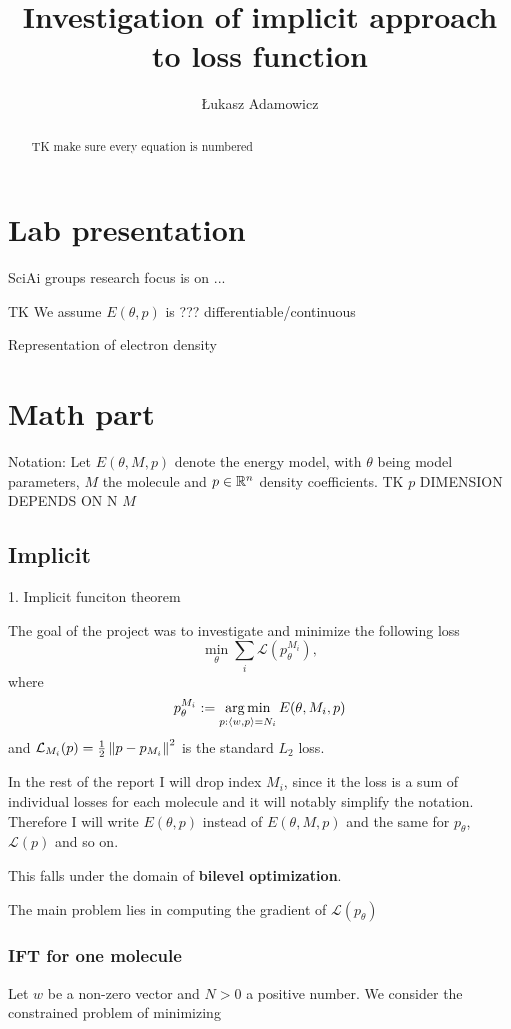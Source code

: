 \documentclass[a4paper,10pt]{report}
\title{Investigation of implicit approach to loss function}
\author{Łukasz Adamowicz}
\begin{document}
\maketitle

\begin{abstract}
TK make sure every equation is numbered
\end{abstract}



\section{ Lab presentation}
SciAi groups research focus is on ...

TK
We assume $E(\theta, p)$ is ??? differentiable/continuous

Representation of electron density
 \section{Math part}
Notation: Let $E(\theta, M ,p)$ denote the energy model, with $\theta$ being model parameters, $M$ the molecule and $p\in \mathbb{R}^n$ density coefficients.
TK $p$ DIMENSION DEPENDS ON N $M$

 \subsection{Implicit}
1. Implicit funciton theorem

The goal of the project was to investigate and minimize the following loss
\begin{equation}
 \min_\theta \sum_i \mathcal{L}(p_{\theta}^{M_i}),
\end{equation}
where
\begin{equation}
  p_\theta^{M_i}:=\operatorname*{arg\,min}_{p : \langle w, p \rangle=N_i} E(\theta,M_i,p)
\end{equation}
and $\mathcal{L}_{M_i}(p) = \frac{1}{2}\left\|p-p_{M_i}\right\|^2$ is the standard $L_2$ loss.

In the rest of the report I will drop index $M_i$, since it the loss is a sum of individual losses for each molecule and it will notably simplify the notation.
Therefore I will write $E(\theta,p)$ instead of $E(\theta,M,p)$ and the same for $p_\theta$, $\mathcal{L}(p)$ and so on.

This falls under the domain of \textbf{bilevel optimization}.

The main problem lies in computing the gradient of $\mathcal{L}(p_\theta)$


\subsubsection{ IFT for one molecule}
Let $w$ be a non-zero vector and $N>0$ a positive number.
We consider the constrained problem of minimizing
\end{document}
